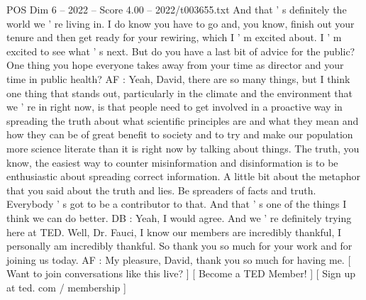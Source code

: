 \begin{textsample}{POS Dim 6 – 2022 – Score 4.00 – 2022/t003655.txt}
And that ' s definitely the world we ' re living in.
I do know you have to go and, you know, finish out your tenure and then get ready for your rewiring, which I ' m excited about.
I ' m excited to see what ' s next.
But do you have a last bit of advice for the public?
One thing you hope everyone takes away from your time as director and your time in public health?
AF : Yeah, David, there are so many things, but I think one thing that stands out, particularly in the climate and the environment that we ' re in right now, is that people need to get involved in a proactive way in spreading the truth about what scientific principles are and what they mean and how they can be of great benefit to society and to try and make our population more science literate than it is right now by talking about things.
The truth, you know, the easiest way to counter misinformation and disinformation is to be enthusiastic about spreading correct information.
A little bit about the metaphor that you said about the truth and lies.
Be spreaders of facts and truth.
Everybody ' s got to be a contributor to that.
And that ' s one of the things I think we can do better.
DB : Yeah, I would agree.
And we ' re definitely trying here at TED.
Well, Dr.
Fauci, I know our members are incredibly thankful, I personally am incredibly thankful.
So thank you so much for your work and for joining us today.
AF : My pleasure, David, thank you so much for having me. [ Want to join conversations like this live? ] [ Become a TED Member! ] [ Sign up at ted. com / membership ]

\end{textsample}
